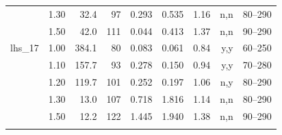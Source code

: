 \begin{longtable}{@{}l r r r r r r r r@{}}
 & 1.30 & 32.4 & 97 & 0.293 & 0.535 & 1.16 & n,n & 80--290 \\
 & 1.50 & 42.0 & 111 & 0.044 & 0.413 & 1.37 & n,n & 90--290 \\
\addlinespace
lhs\_17 & 1.00 & 384.1 & 80 & 0.083 & 0.061 & 0.84 & y,y & 60--250 \\
 & 1.10 & 157.7 & 93 & 0.278 & 0.150 & 0.94 & y,y & 70--280 \\
 & 1.20 & 119.7 & 101 & 0.252 & 0.197 & 1.06 & n,y & 80--290 \\
 & 1.30 & 13.0 & 107 & 0.718 & 1.816 & 1.14 & n,n & 80--290 \\
 & 1.50 & 12.2 & 122 & 1.445 & 1.940 & 1.38 & n,n & 90--290 \\
\addlinespace
\bottomrule
\end{longtable}